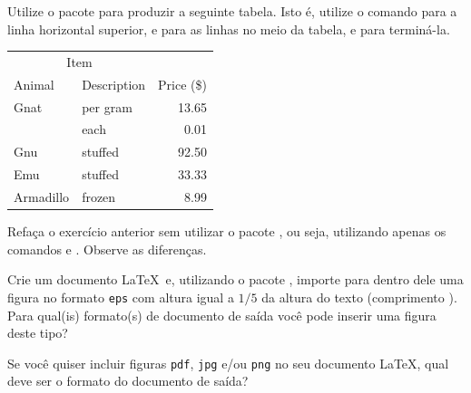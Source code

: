 \documentclass[a4paper,10pt,twocolumn,landscape]{article}
\begin{document}
	\begin{exercicio}
		Utilize o pacote  para produzir a seguinte tabela. Isto é, 
		utilize o comando  para a linha horizontal superior,
		 e  para as linhas no meio da tabela, e
		 para terminá-la.
		
		\medskip
		
		\centering
		\begin{tabular}{llr}			
			\toprule
			\multicolumn{2}{c}{Item} \\
			\cmidrule{1-2}
			Animal & Description & Price (\$) \\
			\midrule
			Gnat      & per gram & 13.65 \\
			          & each     &  0.01 \\
			Gnu       & stuffed  & 92.50 \\
			Emu       & stuffed  & 33.33 \\
			Armadillo & frozen   & 8.99  \\
			\bottomrule
		\end{tabular}
	\end{exercicio}

	\begin{exercicio}
		Refaça o exercício anterior sem utilizar o pacote , ou seja,
		utilizando apenas os comandos  e . Observe as 
		diferenças.
	\end{exercicio}

	\begin{exercicio}
		Crie um documento \LaTeX\ e, utilizando o pacote , importe 
		para dentro dele uma figura no formato \texttt{eps} com altura igual a 
		$1/5$ da altura do texto (comprimento ). Para qual(is) 
		formato(s) de documento de saída você pode inserir uma figura deste tipo?
	\end{exercicio}
		
	\begin{exercicio}
		Se você quiser incluir figuras \texttt{pdf}, \texttt{jpg} e/ou 
		\texttt{png} no seu	documento	\LaTeX, qual deve ser o formato do documento
		de saída?
	\end{exercicio}
	
	\newsavebox{\minhacaixa}
	
\end{document}
